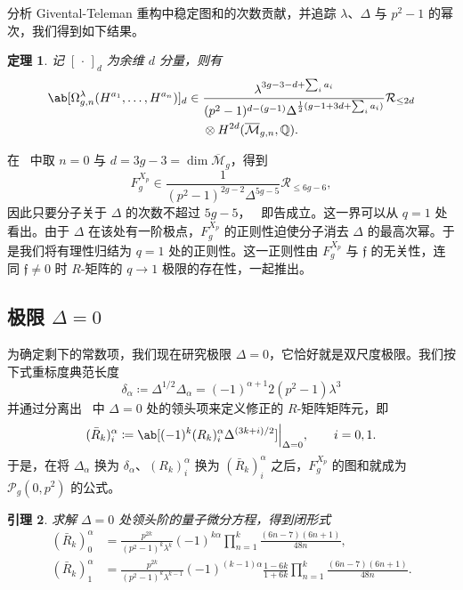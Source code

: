 \documentclass{amsart}
\newtheorem{thm}{定理}[section]
\newtheorem{lem}[thm]{引理}
\theoremstyle{definition}
\theoremstyle{remark}
\theoremstyle{plain}
\theoremstyle{definition}
\theoremstyle{remark}
\newcommand{\Q}{\mathbb{Q}}
\newcommand{\Mbar}{\overline{\mathcal{M}}}
\newcommand{\mc}[1]{\mathcal{#1}}
\newcommand{\mf}[1]{\mathfrak{#1}}
\newcommand{\1}{\mathbf{1}}
\newcommand{\2}{\mathbf{2}}
\newcommand{\3}{\mathbf{3}}
\begin{document}
分析 Givental-Teleman 重构中稳定图和的次数贡献，并追踪 \(\lambda\)、\(\Delta\) 与 \(p^2-1\) 的幂次，我们得到如下结果。

\begin{thm}%
\label{thm:local P1 reconstruction}
    记 \([\,\cdot\,]_d\) 为余维 \(d\) 分量，则有
    \begin{align*}
        \ab[\Omega^{\lambda}_{g,n}(H^{a_1},\ldots,H^{a_n})]_d \in{}& \frac{\lambda^{3g-3-d+\sum_i a_i}}{(p^2-1)^{d-(g-1)}\Delta^{\frac{1}{2}(g-1+3d+\sum_i a_i)}}\mc{R}_{\leq 2d} \\
        &\otimes H^{2d}(\Mbar_{g,n},\Q).
    \end{align*}
\end{thm}

在~ 中取 \(n=0\) 与 \(d = 3g-3 = \dim \Mbar_g\)，得到
\[ F_g^{X_p} \in \frac{1}{(p^2-1)^{2g-2}\Delta^{5g-5}}\mc{R}_{\leq 6g-6}, \]
因此只要分子关于 \(\Delta\) 的次数不超过 \(5g-5\)，~ 即告成立。这一界可以从 \(q=1\) 处看出。由于 \(\Delta\) 在该处有一阶极点，\(F_g^{X_p}\) 的正则性迫使分子消去 \(\Delta\) 的最高次幂。于是我们将有理性归结为 \(q=1\) 处的正则性。这一正则性由 \(F_g^{X_p}\) 与 \(\mf{f}\) 的无关性，连同 \(\mf{f} \neq 0\) 时 \(R\)-矩阵的 \(q \to 1\) 极限的存在性，一起推出。

\subsection{极限 \(\Delta = 0\)}%
\label{sub:The limit Delta = 0}

为确定剩下的常数项，我们现在研究极限 \(\Delta = 0\)，它恰好就是双尺度极限。我们按下式重标度典范长度
\[ \delta_{\alpha} \coloneqq \Delta^{1/2}\Delta_{\alpha} = (-1)^{\alpha+1}2(p^2-1)\lambda^3 \]
并通过分离出~ 中 \(\Delta = 0\) 处的领头项来定义修正的 \(R\)-矩阵矩阵元，即
\[ (\bar{R}_k)_i^{\alpha} \coloneqq \ab[(-1)^k (R_k)_i^{\alpha}\Delta^{(3k+i)/2}]\Big|_{\Delta=0}, \qquad i = 0,1. \]
于是，在将 \(\Delta_{\alpha}\) 换为 \(\delta_{\alpha}\)、\((R_k)_i^{\alpha}\) 换为 \((\bar{R}_k)_i^{\alpha}\) 之后，\(F_g^{X_p}\) 的图和就成为 \(\mc{P}_g(0,p^2)\) 的公式。

\begin{lem}%
\label{lem:R matrix at Delta zero}
    求解 \(\Delta = 0\) 处领头阶的量子微分方程，得到闭形式
    \begin{align*}
        (\bar{R}_k)_0^{\alpha} &= \frac{p^{2k}}{(p^2-1)^k\lambda^k}(-1)^{k\alpha}\prod_{n=1}^k \frac{(6n-7)(6n+1)}{48n}, \\
        (\bar{R}_k)_1^{\alpha} &= \frac{p^{2k}}{(p^2-1)^k \lambda^{k-1}}(-1)^{(k-1)\alpha}\frac{1-6k}{1+6k}\prod_{n=1}^k \frac{(6n-7)(6n+1)}{48n}.
    \end{align*}
\end{lem}
\end{document}
